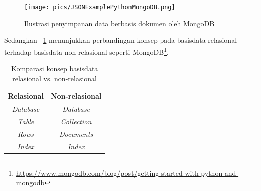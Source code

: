 \begin{figure}
  \begin{center}
    \texttt{[image: pics/JSONExamplePythonMongoDB.png]}
    \caption{Ilustrasi penyimpanan data berbasis dokumen oleh MongoDB}
    \label{fig:jsonmongo}
  \end{center}
\end{figure}

Sedangkan \tablename~\ref{tab:relasimongo} menunjukkan perbandingan konsep pada basisdata relasional terhadap basisdata non-relasional seperti MongoDB\footnote{\url{https://www.mongodb.com/blog/post/getting-started-with-python-and-mongodb}}.

\begin{table}[h]
\caption{Komparasi konsep basisdata relasional vs. non-relasional}
\label{tab:relasimongo}
  \begin{center}
    \begin{tabular}{@{}cc@{}}\toprule
    Relasional & Non-relasional\\ \midrule
  \textit{Database} & \textit{Database} \\ 
  \textit{Table} & \textit{Collection} \\
  \textit{Rows} & \textit{Documents}\\
  \textit{Index} & \textit{Index}\\
       \bottomrule
    \end{tabular}
  \end{center}
\end{table}
